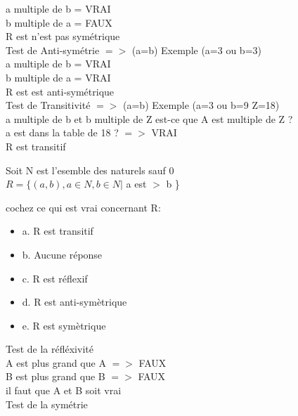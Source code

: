 a multiple de b = VRAI \\
b multiple de a = FAUX \\
R est n'est pas symétrique \\


Test de Anti-symétrie $=>$ (a=b) Exemple (a=3 ou b=3) \\

a multiple de b = VRAI \\
b multiple de a = VRAI \\
R est est anti-symétrique \\


Test de Transitivité $=>$ (a=b) Exemple (a=3 ou b=9 Z=18) \\

a multiple de b et b multiple de Z est-ce que A est multiple de Z ? \\
a est dans la table de 18 ?  $=>$ VRAI \\
R est transitif \\

\newpage

Soit N est l’esemble des naturels sauf 0 \\
$R=\{(a,b), a ∈ N, b ∈ N |$ a est $>$ b \} \\

\vspace{2mm} %

cochez ce qui est vrai concernant R: \\

\begin{itemize}[label=$\square$]
\item {a. R est transitif}
\item {b. Aucune réponse}
\item {c. R est réflexif}
\item {d. R est anti-symètrique}
\item {e. R est symètrique}
\end{itemize}

\vspace{4mm} %

Test de la réfléxivité \\

A est plus grand que A $=>$ FAUX \\
B est plus grand que B $=>$ FAUX \\
il faut que A et B soit vrai \\

Test de la symétrie \\

